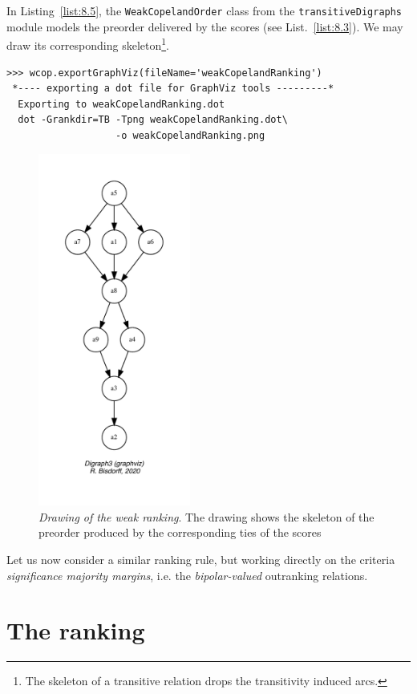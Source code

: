 In Listing~\vref{list:8.5}, the \texttt{WeakCopelandOrder} class from the \texttt{transitiveDigraphs} module models the preorder delivered by the \Copeland scores (see List.~\vref{list:8.3}). We may draw its corresponding skeleton\footnote{The skeleton of a transitive relation drops the transitivity induced arcs.}.
\begin{lstlisting}
>>> wcop.exportGraphViz(fileName='weakCopelandRanking')
 *---- exporting a dot file for GraphViz tools ---------*
  Exporting to weakCopelandRanking.dot
  dot -Grankdir=TB -Tpng weakCopelandRanking.dot\
                   -o weakCopelandRanking.png
\end{lstlisting}
\begin{figure}[ht]
\sidecaption[t]
\includegraphics[width=5cm]{Figures/8-2-weakCopelandRanking.pdf}
\caption[Drawing of the weak \Copeland ranking]{\emph{Drawing of the weak \Copeland ranking}. The drawing shows the skeleton of the preorder produced by the corresponding ties of the \Copeland scores}
\label{fig:8.2}       %
\end{figure}

Let us now consider a similar ranking rule, but working directly on the criteria \emph{significance majority margins}, i.e. the \emph{bipolar-valued} outranking relations.

\section{The \NetFlows ranking}
\label{sec:8.3}

